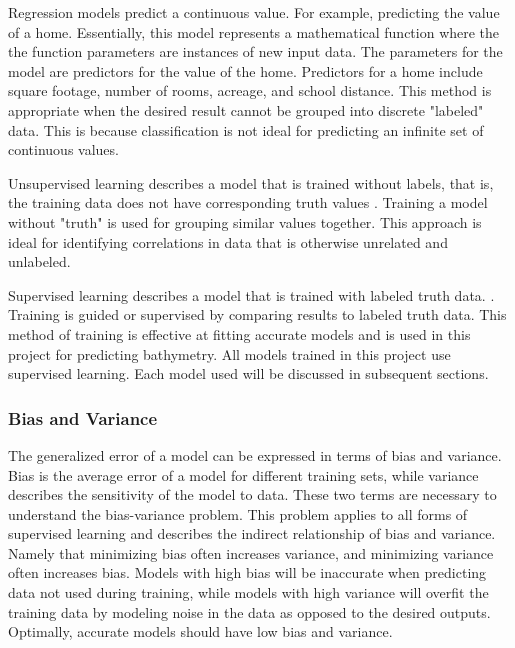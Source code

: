 \par
Regression models predict a continuous value.
For example, predicting the value of a home.
Essentially, this model represents a mathematical function where the the function parameters are instances of new input data.
The parameters for the model are predictors for the value of the home.
Predictors for a home include square footage, number of rooms, acreage, and school distance.
This method is appropriate when the desired result cannot be grouped into discrete "labeled" data.
This is because classification is not ideal for predicting an infinite set of continuous values.

\par
Unsupervised learning describes a model that is trained without labels, that is, the training data does not have corresponding truth values \cite{bishop2006pattern}.
Training a model without "truth" is used for grouping similar values together.
This approach is ideal for identifying correlations in data that is otherwise unrelated and unlabeled.

\par
Supervised learning describes a model that is trained with labeled truth data. \cite{bishop2006pattern}.
Training is guided or supervised by comparing results to labeled truth data.
This method of training is effective at fitting accurate models and is used in this project for predicting bathymetry.
All models trained in this project use supervised learning.
Each model used will be discussed in subsequent sections.

\subsubsection{Bias and Variance}
The generalized error of a model can be expressed in terms of bias and variance.
Bias is the average error of a model for different training sets, while variance describes the sensitivity of the model to data.
These two terms are necessary to understand the bias-variance problem.
This problem applies to all forms of supervised learning \cite{geman1992neural} and describes the indirect relationship of bias and variance.
Namely that minimizing bias often increases variance, and minimizing variance often increases bias.
Models with high bias will be inaccurate when predicting data not used during training, while models with high variance will overfit \cite{cawley2010over} the training data by modeling noise in the data as opposed to the desired outputs.
Optimally, accurate models should have low bias and variance.

